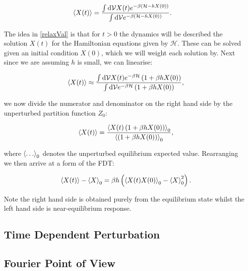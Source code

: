 \begin{align}
\expval{X(t)} &= \frac{\int \dd \mathcal{V} X(t) e^{-\beta \left( \mathcal{H}-hX(0) \right) }  }{\int \dd \mathcal{V} e^{-\beta \left( \mathcal{H}-hX(0) \right) }}. \label{relaxVal}
\end{align}

\noindent The idea in \ref{relaxVal} is that for $t >0$ the dynamics will be described the solution $X(t)$ for the Hamiltonian equations given by $\mathcal{H}$. These can be solved given an initial condition $X(0)$, which we will weight each solution by. Next since we are assuming $h$ is small, we can linearise:

\begin{align}
\expval{X(t)} \approx \frac{\int \dd \mathcal{V} X(t) e^{-\beta \mathcal{H} } \left(1 +\beta h X(0) \right)  }{\int \dd \mathcal{V} e^{-\beta\mathcal{H} } \left(1 +\beta h X(0) \right)},
\end{align}

\noindent we now divide the numerator and denominator on the right hand side by the unperturbed partition function $Z_0$:

\begin{align}
\expval{X(t)} = \frac{\expval{X(t) \left(1 +\beta h X(0) \right) }_0}{\expval{\left(1 +\beta h X(0) \right)}_0},
\end{align}

\noindent where $\expval{ \ldots }_0$ denotes the unperturbed equilibrium expected value. Rearranging we then arrive at a form of the FDT:

\begin{align}
\expval{X(t)} - \expval{X}_0 = \beta h \left( \expval{X(t)X(0)}_0 - \expval{X}_0 ^2 \right).
\end{align}

Note the right hand side is obtained purely from the equilibrium state whilst the left hand side is near-equilibrium response. 

\subsection{Time Dependent Perturbation}
\subsection{Fourier Point of View}

